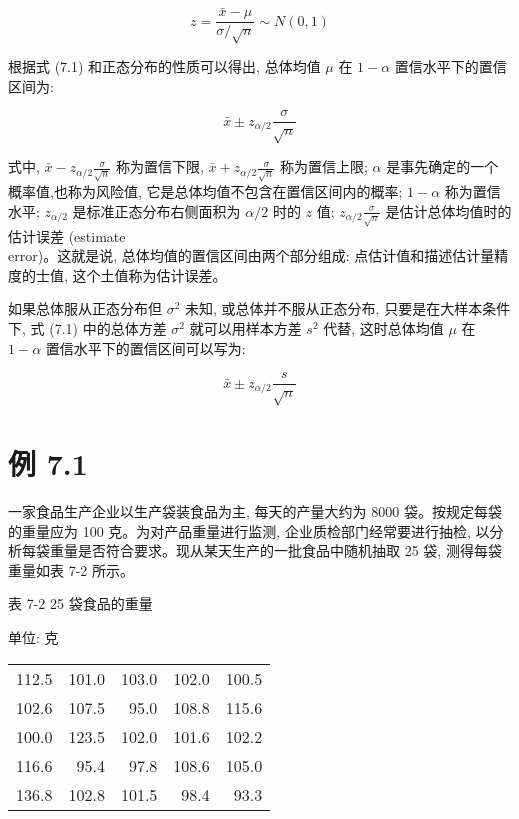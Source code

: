 \documentclass[10pt]{article}
\begin{document}
\begin{CJK*}{UTF8}{bsmi}
\begin{equation*}
z=\frac{\bar{x}-\mu}{\sigma / \sqrt{n}} \sim N(0,1) \tag{7.1}
\end{equation*}


根据式 (7.1) 和正态分布的性质可以得出, 总体均值 $\mu$ 在 $1-\alpha$ 置信水平下的置信区间为:


\begin{equation*}
\bar{x} \pm z_{\alpha / 2} \frac{\sigma}{\sqrt{n}} \tag{7.2}
\end{equation*}


式中, $\bar{x}-z_{\alpha / 2} \frac{\sigma}{\sqrt{n}}$ 称为置信下限, $\bar{x}+z_{\alpha / 2} \frac{\sigma}{\sqrt{n}}$ 称为置信上限; $\alpha$ 是事先确定的一个概率值,也称为风险值, 它是总体均值不包含在置信区间内的概率; $1-\alpha$ 称为置信水平; $z_{\alpha / 2}$ 是标准正态分布右侧面积为 $\alpha / 2$ 时的 $z$ 值; $z_{\alpha / 2} \frac{\sigma}{\sqrt{n}}$ 是估计总体均值时的估计误差 (estimate\\
error)。这就是说, 总体均值的置信区间由两个部分组成: 点估计值和描述估计量精度的士值, 这个土值称为估计误差。

如果总体服从正态分布但 $\sigma^{2}$ 未知, 或总体并不服从正态分布, 只要是在大样本条件下, 式 (7.1) 中的总体方差 $\sigma^{2}$ 就可以用样本方差 $s^{2}$ 代替, 这时总体均值 $\mu$ 在 $1-\alpha$ 置信水平下的置信区间可以写为:


\begin{equation*}
\bar{x} \pm z_{\alpha / 2} \frac{s}{\sqrt{n}} \tag{7.3}
\end{equation*}


\section*{例 7.1}
一家食品生产企业以生产袋装食品为主, 每天的产量大约为 8000 袋。按规定每袋的重量应为 100 克。为对产品重量进行监测, 企业质检部门经常要进行抽检, 以分析每袋重量是否符合要求。现从某天生产的一批食品中随机抽取 25 袋, 测得每袋重量如表 7-2 所示。

表 7-2 25 袋食品的重量

单位: 克

\begin{center}
\begin{tabular}{rrrrr}
\hline
112.5 & 101.0 & 103.0 & 102.0 & 100.5 \\
102.6 & 107.5 & 95.0 & 108.8 & 115.6 \\
100.0 & 123.5 & 102.0 & 101.6 & 102.2 \\
116.6 & 95.4 & 97.8 & 108.6 & 105.0 \\
136.8 & 102.8 & 101.5 & 98.4 & 93.3 \\
\hline
\end{tabular}
\end{center}


\end{CJK*}
\end{document}
